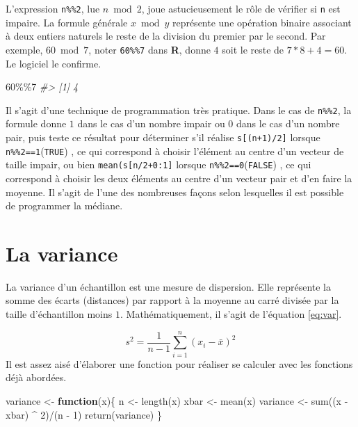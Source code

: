 \documentclass[
]{book}
\newenvironment{Shaded}{}{}
\newcommand{\CommentTok}[1]{\textit{#1}}
\newcommand{\ControlFlowTok}[1]{\textbf{#1}}
\newcommand{\DecValTok}[1]{#1}
\newcommand{\FunctionTok}[1]{#1}
\newcommand{\NormalTok}[1]{#1}
\newcommand{\OtherTok}[1]{#1}
\newcommand{\SpecialCharTok}[1]{#1}
\begin{document}
L'expression \texttt{n\%\%2}, lue \(n \bmod 2\), joue astucieusement le rôle de vérifier si \texttt{n} est impaire. La formule générale \(x \bmod y\) représente une opération binaire associant à deux entiers naturels le reste de la division du premier par le second. Par exemple, \(60 \bmod 7\), noter \texttt{60\%\%7} dans \textbf{R}, donne \(4\) soit le reste de \(7*8 + 4 = 60\). Le logiciel le confirme.

\begin{Shaded}
\begin{Highlighting}[]
\DecValTok{60}\SpecialCharTok{\%\%}\DecValTok{7}
\CommentTok{\#\textgreater{} [1] 4}
\end{Highlighting}
\end{Shaded}

Il s'agit d'une technique de programmation très pratique. Dans le cas de \texttt{n\%\%2}, la formule donne \(1\) dans le cas d'un nombre impair ou \(0\) dans le cas d'un nombre pair, puis teste ce résultat pour déterminer s'il réalise \texttt{s{[}(n+1)/2{]}} lorsque \texttt{n\%\%2==1}(\texttt{TRUE}) , ce qui correspond à choisir l'élément au centre d'un vecteur de taille impair, ou bien \texttt{mean(s{[}n/2+0:1{]}} lorsque \texttt{n\%\%2==0}(\texttt{FALSE}) , ce qui correspond à choisir les deux éléments au centre d'un vecteur pair et d'en faire la moyenne. Il s'agit de l'une des nombreuses façons selon lesquelles il est possible de programmer la médiane.

\hypertarget{la-variance}{%
\section{La variance}\label{la-variance}}

La variance d'un échantillon est une mesure de dispersion. Elle représente la somme des écarts (distances) par rapport à la moyenne au carré divisée par la taille d'échantillon moins \(1\). Mathématiquement, il s'agit de l'équation \eqref{eq:var}.

\[
s^2 = \frac{1}{n-1}\sum_{i=1}^n(x_i-\bar{x})^2
\label{eq:var}
\]
Il est assez aisé d'élaborer une fonction pour réaliser se calculer avec les fonctions déjà abordées.

\begin{Shaded}
\begin{Highlighting}[]
\NormalTok{variance }\OtherTok{\textless{}{-}} \ControlFlowTok{function}\NormalTok{(x)\{}
\NormalTok{  n }\OtherTok{\textless{}{-}} \FunctionTok{length}\NormalTok{(x)}
\NormalTok{  xbar }\OtherTok{\textless{}{-}} \FunctionTok{mean}\NormalTok{(x)}
\NormalTok{  variance }\OtherTok{\textless{}{-}} \FunctionTok{sum}\NormalTok{((x }\SpecialCharTok{{-}}\NormalTok{ xbar) }\SpecialCharTok{\^{}} \DecValTok{2}\NormalTok{)}\SpecialCharTok{/}\NormalTok{(n }\SpecialCharTok{{-}} \DecValTok{1}\NormalTok{)}
  \FunctionTok{return}\NormalTok{(variance)}
\NormalTok{\}}
\end{Highlighting}
\end{Shaded}
\end{document}
